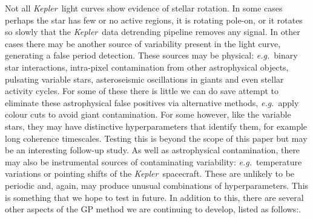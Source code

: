 \documentclass[useAMS, usenatbib, preprint, 12pt]{aastex}
\newcommand{\Kepler}{{\it Kepler}}
\newcommand{\kepler}{\Kepler}
\newcommand{\eg}{{\it e.g.}}
\begin{document}
Not all \kepler\ light curves show evidence of stellar rotation.
In some cases perhaps the star has few or no active regions, it is rotating
pole-on, or it rotates so slowly that the \kepler\ data detrending pipeline
removes any signal.
In other cases there may be another source of variability present in the light
curve, generating a false period detection.
These sources may be physical: \eg\ binary star interactions, intra-pixel
contamination from other astrophysical objects, pulsating variable stars,
asteroseismic oscillations in giants and even stellar activity cycles.
For some of these there is little we can do save attempt to eliminate these
astrophysical false positives via alternative methods, \eg\ apply colour cuts
to avoid giant contamination.
For some however, like the variable stars, they may have distinctive
hyperparameters that identify them, for example long coherence timescales.
Testing this is beyond the scope of this paper but may be an interesting
follow-up study.
As well as astrophysical contamination, there may also be instrumental sources
of contaminating variability: \eg\ temperature variations or pointing shifts
of the \kepler\ spacecraft.
These are unlikely to be periodic and, again, may produce unusual combinations
of hyperparameters.
This is something that we hope to test in future.
In addition to this, there are several other aspects of the GP method we are
continuing to develop, listed as follows:.
\end{document}

